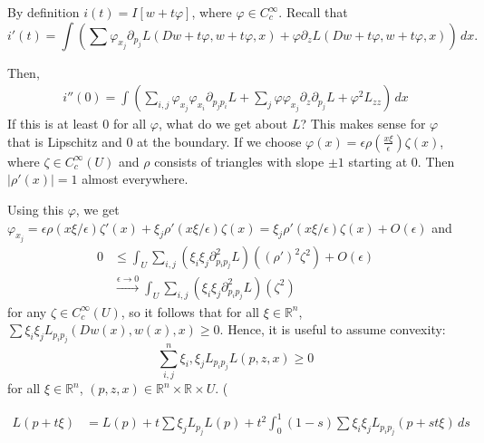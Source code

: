 \documentclass[12pt]{scrartcl}
\newcommand{\R}{\mathbb{R}}
\newcommand{\<}{\langle}
\renewcommand{\>}{\rangle}
\let \phi \varphi
\begin{document}
By definition $i(t) = I[w + t\phi]$, where $\phi \in C_c^\infty$.   Recall that
$$i'(t) = \int\left ( \sum \phi_{x_j} \partial_{p_j}L(Dw + t\phi, w + t\phi, x) + \phi \partial_zL(Dw + t\phi, w + t\phi, x)\right )\,dx.$$

Then,
\begin{align*}
i''(0) = \int \left (\sum_{i, j} \phi_{x_j} \phi_{x_i} \partial_{p_j p_i}L + \sum_j \phi \phi_{x_j} \partial_z \partial_{p_j} L + \phi^2 L_{zz} \right )\,dx
\end{align*}
If this is at least $0$ for all $\phi$, what do we get about $L$?   This makes sense for $\phi$ that is Lipschitz and $0$ at the boundary.  If we choose $\phi(x) = \epsilon \rho(\frac{x \xi}{\epsilon}) \zeta(x)$, where $\zeta \in C_c^\infty(U)$ and  $\rho$ consists of triangles with slope $\pm 1$ starting at $0$.  Then $|\rho'(x)| = 1$ almost everywhere.  

Using this $\phi$, we get $\phi_{x_j} = \epsilon \rho(x \xi / \epsilon) \zeta'(x) + \xi_j \rho'(x \xi/\epsilon) \zeta(x) = \xi_j \rho'(x \xi/\epsilon) \zeta(x) + O(\epsilon)$ and 
\begin{align*}
0 &\le \int_U \sum_{i, j} (\xi_i \xi_j \partial_{p_ip_j}^2 L)((\rho')^2 \zeta^2) + O(\epsilon) \\
&\xrightarrow{\epsilon \to 0} \int_U \sum_{i, j} (\xi_i \xi_j \partial_{p_ip_j}^2 L)( \zeta^2) 
\end{align*}
for any $\zeta \in C_c^\infty(U)$, so it follows that for all $\xi \in \R^n$, $\sum \xi_i \xi_j L_{p_ip_j}(Dw(x), w(x), x) \ge 0$.  Hence, it is useful to assume convexity:
$$\sum_{i, j}^n \xi_i, \xi_j L_{p_i p_j} L(p, z, x) \ge 0$$
for all $\xi \in \R^n$, $(p, z, x) \in \R^n \times \R \times U$.  (

\begin{align*}
L(p + t\xi) &= L(p) + t \sum \xi_j L_{p_j} L(p) + t^2 \int_{0}^1 (1 - s) \sum \xi_i \xi_j L_{p_ip_j}(p + st\xi)\,ds \\
\end{align*}
\end{document}
